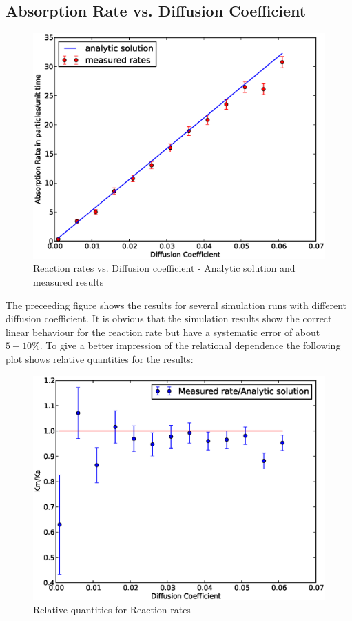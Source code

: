 \subsection{Absorption Rate vs. Diffusion Coefficient}
\begin{figure}[H]
    \centering
    \includegraphics[width=.9 \textwidth, keepaspectratio]{Kabs.eps}
    \caption{Reaction rates vs. Diffusion coefficient - Analytic solution and measured results}
    \label{fig:Kabs_D}
\end{figure}
The preceeding figure shows the results for several simulation runs with different diffusion coefficient. It is obvious that the simulation results show the correct linear behaviour for the reaction rate but have a systematic error of about $5 - 10 \%$. To give a better impression of the relational dependence the following plot shows relative quantities for the results:
\begin{figure}[H]
    \centering
    \includegraphics[width = .9 \textwidth, keepaspectratio]{Krel.eps}
    \caption{Relative quantities for Reaction rates}
    \label{fig:Krel_d}
\end{figure}

